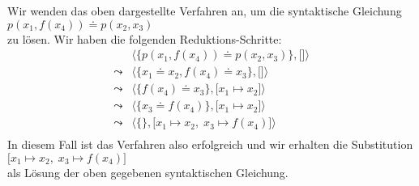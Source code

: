 \example
Wir wenden das oben dargestellte Verfahren an, um die syntaktische Gleichung \\[0.2cm]
\hspace*{1.3cm}  $p(x_1, f(x_4)) \doteq p( x_2, x_3)$  \\[0.2cm]
zu lösen.  Wir haben die folgenden Reduktions-Schritte:
$$
\begin{array}{ll}
          &  \big\langle \big\{ p(x_1, f(x_4)) \doteq p( x_2, x_3) \big\}, \big[ \big] \big\rangle \\[0.2cm]
 \leadsto &  \big\langle \big\{ x_1 \doteq x_2, f(x_4) \doteq x_3 \big\}, \big[ \big] \big\rangle \\[0.2cm]
 \leadsto &  \big\langle \big\{ f(x_4) \doteq x_3 \big\}, \big[ x_1 \mapsto x_2 \big] \big\rangle \\[0.2cm]
 \leadsto &  \big\langle \big\{ x_3 \doteq f(x_4) \big\}, \big[ x_1 \mapsto x_2 \big] \big\rangle \\[0.2cm]
 \leadsto &  \big\langle \big\{\big\}, \big[ x_1 \mapsto x_2,\; x_3 \mapsto f(x_4) \big] \big\rangle \\[0.2cm]
\end{array}
$$
In diesem Fall ist das Verfahren also erfolgreich und wir erhalten die Substitution \\[0.2cm]
\hspace*{1.3cm} $\big[ x_1 \mapsto x_2,\; x_3 \mapsto f(x_4) \big]$ \\[0.2cm]
als Lösung der oben gegebenen syntaktischen Gleichung.  \eox

